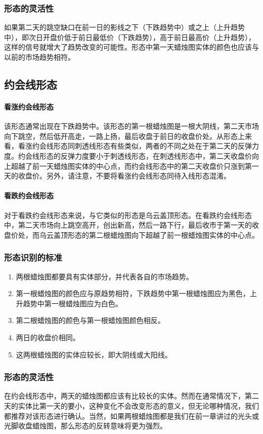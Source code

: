 \subsubsection*{形态的灵活性}
如果第二天的跳空缺口在前一日的影线之下（下跌趋势中）或之上（上升趋势中），即次日开盘价低于前日最低价（下跌趋势），高于前日最高价（上升趋势），这样的信号就增大了趋势改变的可能性。形态中第一天蜡烛图实体的颜色也应该与以前的市场趋势相符。
\subsection{约会线形态}
\paragraph{看涨约会线形态} 该形态通常出现在下跌趋势中。该形态的第一根蜡烛图是一根大阴线，第二天市场向下跳空，然后低开高走，一路上扬，最后收盘于前日的收盘价处。从形态上来看，看涨约会线形态同刺透线形态有些类似，两者的不同之处在于第二天的反弹力度。约会线形态的反弹力度要小于刺透线形态，在刺透线形态中，第二天收盘价向上超越了前一天蜡烛图实体的中心点，而约会线形态中的第二天收盘价只涨到第一天的收盘价。另外，请注意，不要将看涨约会线形态同待入线形态混淆。

\paragraph{看跌约会线形态} 对于看跌约会线形态来说，与它类似的形态是乌云盖顶形态。在看跌约会线形态中，第二天市场向上跳空高开，创出新高，然后一路下行，最后收市于第一天的收盘价处，而乌云盖顶形态的第二根蜡烛图向下超越了前一根蜡烛图实体的中心点。
\subsubsection*{形态识别的标准}
\begin{enumerate}
    \item 两根蜡烛图都要具有实体部分，并代表各自的市场趋势。
    \item 第一根蜡烛图的颜色应与原趋势相符，下跌趋势中第一根蜡烛图应为黑色，上升趋势中第一根蜡烛图应为白色。
    \item 第二根蜡烛图的颜色与第一根蜡烛图颜色相反。
    \item 两日的收盘价相同。
    \item 这两根蜡烛图的实体应较长，即大阴线或大阳线。
\end{enumerate}
\subsubsection*{形态的灵活性}
在约会线形态中，两天的蜡烛图都应该有比较长的实体。然而在通常情况下，第二天的实体比第一天的要小，这种变化不会改变形态的意义，但无论哪种情况，我们都推荐对该形态进行确认。当然，如果两根蜡烛图都是我们在前一章讲过的光头或光脚收盘蜡烛图，那么形态的反转意味将更为强烈。
